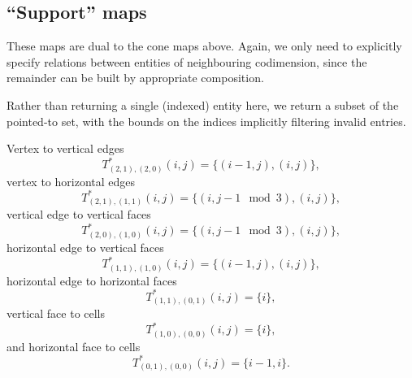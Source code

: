 \documentclass[a4paper,11pt]{article}
\begin{document}
\subsection{``Support'' maps}
\label{sec:support-maps}
These maps are dual to the cone maps above. Again, we only need to
explicitly specify relations between entities of neighbouring
codimension, since the remainder can be built by appropriate
composition.

Rather than returning a single (indexed) entity here, we return a
subset of the pointed-to set, with the bounds on the indices
implicitly filtering invalid entries.

Vertex to vertical edges
\begin{equation}
  \label{eq:17}
  T^*_{(2,1),(2,0)}(i, j) = \{(i-1, j), (i, j)\},
\end{equation}
vertex to horizontal edges
\begin{equation}
  \label{eq:18}
  T^*_{(2,1), (1, 1)}(i, j) = \{(i, j-1 \mod 3), (i, j)\},
\end{equation}
vertical edge to vertical faces
\begin{equation}
  \label{eq:19}
  T^*_{(2, 0), (1, 0)}(i, j) = \{(i, j - 1 \mod 3), (i, j)\},
\end{equation}
horizontal edge to vertical faces
\begin{equation}
  \label{eq:20}
  T^*_{(1, 1), (1, 0)}(i, j) = \{(i - 1, j), (i, j)\},
\end{equation}
horizontal edge to horizontal faces
\begin{equation}
  \label{eq:20}
  T^*_{(1, 1), (0, 1)}(i, j) = \{i\},
\end{equation}
vertical face to cells
\begin{equation}
  \label{eq:21}
  T^*_{(1, 0), (0, 0)}(i, j) = \{i\},
\end{equation}
and horizontal face to cells
\begin{equation}
  \label{eq:22}
  T^*_{(0, 1), (0, 0)}(i, j) = \{i-1, i\}.
\end{equation}
\end{document}
